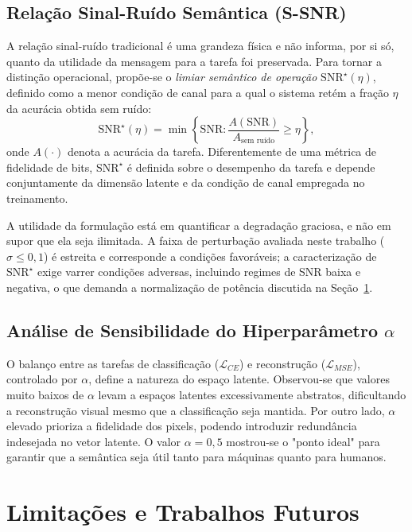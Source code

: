 \documentclass[conference]{IEEEtran}
\begin{document}
\subsection{Relação Sinal-Ruído Semântica (S-SNR)}
A relação sinal-ruído tradicional é uma grandeza física e não informa, por si só, quanto da utilidade da mensagem para a tarefa foi preservada. Para tornar a distinção operacional, propõe-se o \emph{limiar semântico de operação} $\mathrm{SNR}^\star(\eta)$, definido como a menor condição de canal para a qual o sistema retém a fração $\eta$ da acurácia obtida sem ruído:
\begin{equation}
    \mathrm{SNR}^\star(\eta) = \min \left\{ \mathrm{SNR} : \frac{A(\mathrm{SNR})}{A_{\text{sem ruído}}} \geq \eta \right\},
\end{equation}
onde $A(\cdot)$ denota a acurácia da tarefa. Diferentemente de uma métrica de fidelidade de bits, $\mathrm{SNR}^\star$ é definida sobre o desempenho da tarefa e depende conjuntamente da dimensão latente e da condição de canal empregada no treinamento.

A utilidade da formulação está em quantificar a degradação graciosa, e não em supor que ela seja ilimitada. A faixa de perturbação avaliada neste trabalho ($\sigma \leq 0,1$) é estreita e corresponde a condições favoráveis; a caracterização de $\mathrm{SNR}^\star$ exige varrer condições adversas, incluindo regimes de SNR baixa e negativa, o que demanda a normalização de potência discutida na Seção~\ref{sec:limitacoes}.

\subsection{Análise de Sensibilidade do Hiperparâmetro $\alpha$}
O balanço entre as tarefas de classificação ($\mathcal{L}_{CE}$) e reconstrução ($\mathcal{L}_{MSE}$), controlado por $\alpha$, define a natureza do espaço latente. Observou-se que valores muito baixos de $\alpha$ levam a espaços latentes excessivamente abstratos, dificultando a reconstrução visual mesmo que a classificação seja mantida. Por outro lado, $\alpha$ elevado prioriza a fidelidade dos pixels, podendo introduzir redundância indesejada no vetor latente. O valor $\alpha=0,5$ mostrou-se o "ponto ideal" para garantir que a semântica seja útil tanto para máquinas quanto para humanos.

\section{Limitações e Trabalhos Futuros}
\label{sec:limitacoes}
\end{document}
